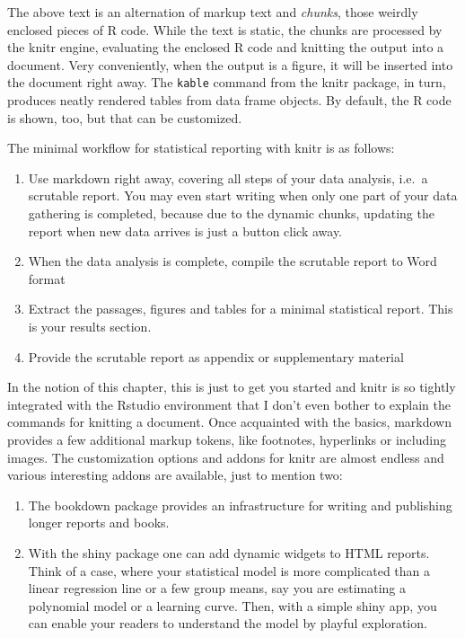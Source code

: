 \documentclass[]{svmono}
\providecommand{\tightlist}{%
  \setlength{\itemsep}{0pt}\setlength{\parskip}{0pt}}
\begin{document}
The above text is an alternation of markup text and \emph{chunks}, those
weirdly enclosed pieces of R code. While the text is static, the chunks
are processed by the knitr engine, evaluating the enclosed R code and
knitting the output into a document. Very conveniently, when the output
is a figure, it will be inserted into the document right away. The
\texttt{kable} command from the knitr package, in turn, produces neatly
rendered tables from data frame objects. By default, the R code is
shown, too, but that can be customized.

The minimal workflow for statistical reporting with knitr is as follows:

\begin{enumerate}
\def\labelenumi{\arabic{enumi}.}
\tightlist
\item
  Use markdown right away, covering all steps of your data analysis,
  i.e.~a scrutable report. You may even start writing when only one part
  of your data gathering is completed, because due to the dynamic
  chunks, updating the report when new data arrives is just a button
  click away.
\item
  When the data analysis is complete, compile the scrutable report to
  Word format
\item
  Extract the passages, figures and tables for a minimal statistical
  report. This is your results section.
\item
  Provide the scrutable report as appendix or supplementary material
\end{enumerate}

In the notion of this chapter, this is just to get you started and knitr
is so tightly integrated with the Rstudio environment that I don't even
bother to explain the commands for knitting a document. Once acquainted
with the basics, markdown provides a few additional markup tokens, like
footnotes, hyperlinks or including images. The customization options and
addons for knitr are almost endless and various interesting addons are
available, just to mention two:

\begin{enumerate}
\def\labelenumi{\arabic{enumi}.}
\tightlist
\item
  The bookdown package provides an infrastructure for writing and
  publishing longer reports and books.
\item
  With the shiny package one can add dynamic widgets to HTML reports.
  Think of a case, where your statistical model is more complicated than
  a linear regression line or a few group means, say you are estimating
  a polynomial model or a learning curve. Then, with a simple shiny app,
  you can enable your readers to understand the model by playful
  exploration.
\end{enumerate}
\end{document}
